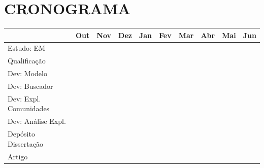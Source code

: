 \documentclass[12pt,a4paper]{article}
\begin{document}
\section{CRONOGRAMA} \label{sec:cronograma}

\begin{center}
  \begin{tabular}{llllllllll}
                           & Out                    & Nov                    & Dez                      & Jan                    & Fev                    & Mar                     & Abr                    & Mai                     & Jun \\
                           \hline
  Estudo: EM               &\cellcolor[gray]{0.9}   &                        &                          &                        &                        &                         &                        &                         &                        \\
  Qualificação             &                        &\cellcolor[gray]{0.9}   &\cellcolor[gray]{0.9}     &                        &                        &                         &                        &                         &                        \\
  Dev: Modelo              &\cellcolor[gray]{0.9}   &                        &                          &                        &                        &                         &                        &                         &                        \\
  Dev: Buscador            &                        &\cellcolor[gray]{0.9}   &                          &                        &                        &                         &                        &                         &                        \\
  Dev: Expl. Comunidades   &                        &                        &\cellcolor[gray]{0.9}     &                        &                        &                         &                        &                         &                        \\
  Dev: Análise Expl.       &                        &                        &                          &\cellcolor[gray]{0.9}   &                        &                         &                        &                         &                        \\
  Depósito Dissertação     &                        &                        &                          &                        &\cellcolor[gray]{0.9}   &                         &                        &                         &                        \\
  Artigo                   &                        &                        &                          &                        &                        &\cellcolor[gray]{0.9}    &\cellcolor[gray]{0.9}   &\cellcolor[gray]{0.9}    &\cellcolor[gray]{0.9}   \\
  \hline
  \end{tabular}
\end{center}


\def\refname{REFERÊNCIAS BIBLIOGRÁFICAS}


\end{document}
